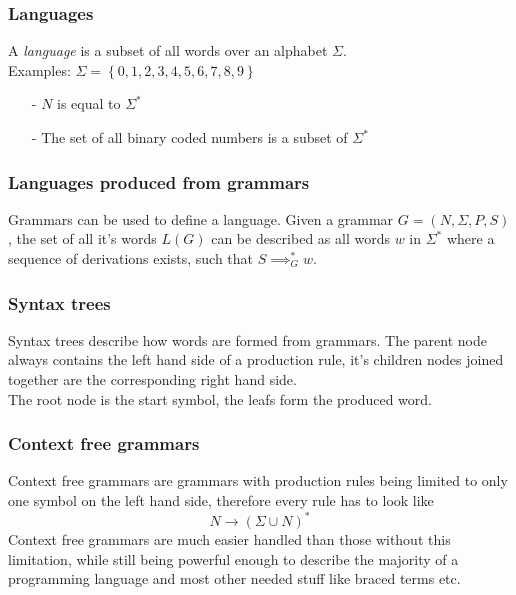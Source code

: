 \documentclass[a4paper]{article}
\newcommand{\tuple}[1]{\left( #1 \right)}
\newcommand{\set}[1]{\left\lbrace #1 \right\rbrace}
\begin{document}
\subsubsection*{Languages}
A \textit{language} is a subset of all words over an alphabet $\Sigma$. \\
Examples: $ \Sigma = \set{0,1,2,3,4,5,6,7,8,9} $
\begin{itemize}
\item[-] $N$ is equal to $\Sigma^*$
\item[-] The set of all binary coded numbers is a subset of $\Sigma^*$
\end{itemize}

\subsubsection*{Languages produced from grammars}
Grammars can be used to define a language. Given a grammar $G = \tuple{N, \Sigma, P, S}$, the set of all it's words $L(G)$ can be described as all words $w$ in $\Sigma^*$ where a sequence of derivations exists, such that $S\implies_G^* w$. 

\subsubsection*{Syntax trees}
Syntax trees describe how words are formed from grammars. The parent node always contains the left hand side of a production rule, it's children nodes joined together are the corresponding right hand side.\\
The root node is the start symbol, the leafs form the produced word.

\subsubsection*{Context free grammars}
Context free grammars are grammars with production rules being limited to only one symbol on the left hand side, therefore every rule has to look like 
$$N \to (\Sigma\cup N)^* $$
Context free grammars are much easier handled than those without this limitation, while still being powerful enough to describe the majority of a programming language and most other needed stuff like braced terms etc.
\end{document}
